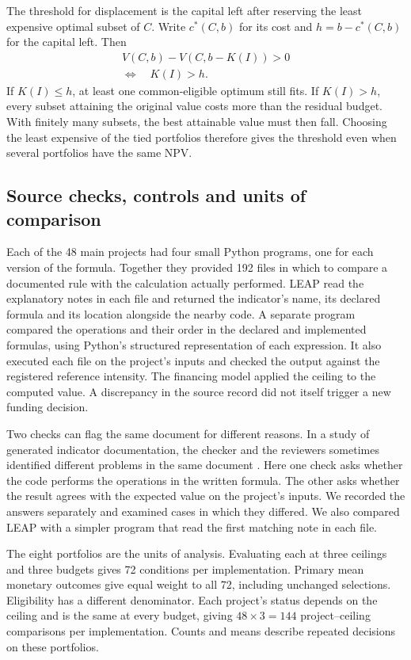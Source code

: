 The threshold for displacement is the capital left after reserving the least expensive optimal subset of $C$. Write $c^*(C,b)$ for its cost and $h=b-c^*(C,b)$ for the capital left. Then
\begin{equation}
\begin{gathered}
 V(C,b)-V(C,b-K(I))>0\\
 \Longleftrightarrow\quad K(I)>h .
 \end{gathered}\label{eq:slack}
\end{equation}
If $K(I)\leq h$, at least one common-eligible optimum still fits. If $K(I)>h$, every subset attaining the original value costs more than the residual budget. With finitely many subsets, the best attainable value must then fall. Choosing the least expensive of the tied portfolios therefore gives the threshold even when several portfolios have the same NPV.

\subsection{Source checks, controls and units of comparison}
Each of the 48 main projects had four small Python programs, one for each version of the formula. Together they provided 192 files in which to compare a documented rule with the calculation actually performed. LEAP read the explanatory notes in each file and returned the indicator's name, its declared formula and its location alongside the nearby code. A separate program compared the operations and their order in the declared and implemented formulas, using Python's structured representation of each expression. It also executed each file on the project's inputs and checked the output against the registered reference intensity. The financing model applied the ceiling to the computed value. A discrepancy in the source record did not itself trigger a new funding decision.

Two checks can flag the same document for different reasons. In a study of generated indicator documentation, the checker and the reviewers sometimes identified different problems in the same document \citep{checks}. Here one check asks whether the code performs the operations in the written formula. The other asks whether the result agrees with the expected value on the project's inputs. We recorded the answers separately and examined cases in which they differed. We also compared LEAP with a simpler program that read the first matching note in each file.

The eight portfolios are the units of analysis. Evaluating each at three ceilings and three budgets gives 72 conditions per implementation. Primary mean monetary outcomes give equal weight to all 72, including unchanged selections. Eligibility has a different denominator. Each project's status depends on the ceiling and is the same at every budget, giving $48\times3=144$ project--ceiling comparisons per implementation. Counts and means describe repeated decisions on these portfolios.

